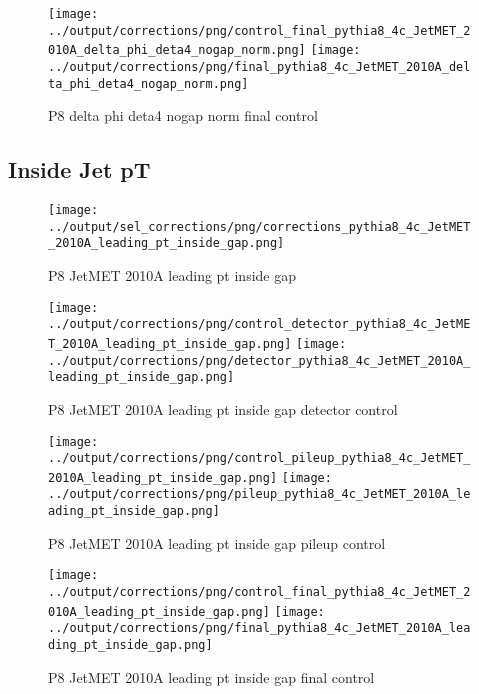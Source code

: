 \documentclass[11pt]{book}
\begin{document}
\begin{figure}[ht]
\centering
\texttt{[image: ../output/corrections/png/control\_final\_pythia8\_4c\_JetMET\_2010A\_delta\_phi\_deta4\_nogap\_norm.png]}
\texttt{[image: ../output/corrections/png/final\_pythia8\_4c\_JetMET\_2010A\_delta\_phi\_deta4\_nogap\_norm.png]}
\caption{P8 delta phi deta4 nogap norm final control}
\label{fig:p8_JetMET_2010A_delta_phi_deta4_nogap_norm_final_control}
\end{figure}

\clearpage
\subsection{Inside Jet pT}
\begin{figure}[ht]
\centering
\texttt{[image: ../output/sel\_corrections/png/corrections\_pythia8\_4c\_JetMET\_2010A\_leading\_pt\_inside\_gap.png]}
\caption{P8 JetMET 2010A leading pt inside gap}
\label{fig:p8_JetMET_2010A_leading_pt_inside_gap}
\end{figure}

\begin{figure}[ht]
\centering
\texttt{[image: ../output/corrections/png/control\_detector\_pythia8\_4c\_JetMET\_2010A\_leading\_pt\_inside\_gap.png]}
\texttt{[image: ../output/corrections/png/detector\_pythia8\_4c\_JetMET\_2010A\_leading\_pt\_inside\_gap.png]}
\caption{P8 JetMET 2010A leading pt inside gap detector control}
\label{fig:p8_JetMET_2010A_leading_pt_inside_gap_detector_control}
\end{figure}

\begin{figure}[ht]
\centering
\texttt{[image: ../output/corrections/png/control\_pileup\_pythia8\_4c\_JetMET\_2010A\_leading\_pt\_inside\_gap.png]}
\texttt{[image: ../output/corrections/png/pileup\_pythia8\_4c\_JetMET\_2010A\_leading\_pt\_inside\_gap.png]}
\caption{P8 JetMET 2010A leading pt inside gap pileup control}
\label{fig:p8_JetMET_2010A_leading_pt_inside_gap_pileup_control}
\end{figure}


\begin{figure}[ht]
\centering
\texttt{[image: ../output/corrections/png/control\_final\_pythia8\_4c\_JetMET\_2010A\_leading\_pt\_inside\_gap.png]}
\texttt{[image: ../output/corrections/png/final\_pythia8\_4c\_JetMET\_2010A\_leading\_pt\_inside\_gap.png]}
\caption{P8 JetMET 2010A leading pt inside gap final control}
\label{fig:p8_JetMET_2010A_leading_pt_inside_gap_final_control}
\end{figure}
\end{document}

